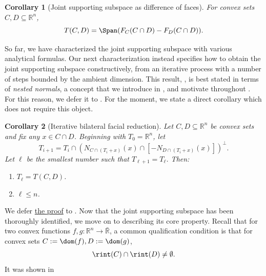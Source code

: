 \documentclass{article}
\theoremstyle{plain}
\newtheorem{corollary}{Corollary}[section]
\theoremstyle{definition}
\theoremstyle{remark}
\begin{document}
\begin{corollary}[Joint supporting subspace as difference of faces]
\label{loc:joint_supporting_subspace_from_difference_of_faces.statement}
For convex sets $C, D \subseteq \mathbb{R}^n$,
\begin{equation*}
T(C, D) = \Span(F_C(C \cap D)-F_D(C \cap D)).
\end{equation*}
\end{corollary}
So far, we have characterized the joint supporting subspace with various
analytical formulas. Our next characterization instead specifies how
to obtain the joint supporting subspace constructively, from an iterative
process with a number of steps bounded
by the ambient dimension.
This result, , is best stated in terms of \emph{nested normals},
a concept that we introduce in ,
and motivate throughout .
For this reason, we defer it to . For the moment, we state a direct corollary which does not require this object.
\begin{corollary}[Iterative bilateral facial reduction]
\label{loc:simplified_iterative_bilateral_facial_reduction.statement}
Let $C, D \subseteq \mathbb{R}^n$ be convex sets and fix any
$x \in C \cap D$. Beginning with $T_0  = \mathbb{R}^n$, let
\begin{equation*}
T_{i+1} = T_i \cap (N_{C \cap (T_i + x)}(x) \cap [-N_{D  \cap (T_i + x)}(x)] )^\perp.
\end{equation*}
Let $\ell$ be the smallest number such that 
$T_{\ell+1} = T_\ell$.  Then:
\begin{enumerate}
\item $T_\ell =  T(C, D)$.
\item $\ell \leq n$.
\end{enumerate}
\end{corollary}
We defer \hyperlink{loc:simplified_iterative_bilateral_facial_reduction.proof}{the proof} to . 
Now that the joint supporting subspace has been thoroughly identified,
we move on to describing its core property.
Recall that for two convex functions $f, g:\mathbb{R}^n \to \bar{\mathbb{R}}$,
a common qualification condition is that for convex sets $C:= \dom(f), D:=\dom(g)$,
\begin{equation}
\label{eq:ri}
\rint(C) \cap \rint(D) \neq \emptyset.
\end{equation}
It was shown in \cite[Theorem 11.3]{rockafellarConvexAnalysis1970}
\end{document}

